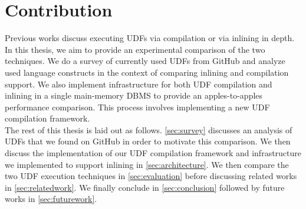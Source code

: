 \documentclass[12pt]{cmuthesis}
\newcommand{\sysname}{NoisePage\xspace}
\begin{document}

\section{Contribution}

Previous works discuss executing UDFs via compilation or via inlining in depth. In this thesis, we aim to provide an experimental comparison of the two techniques. We do a survey of currently used UDFs from GitHub and analyze used language constructs in the context of comparing inlining and compilation support. We also implement infrastructure for both UDF compilation and inlining in a single main-memory DBMS to provide an apples-to-apples performance comparison. This process involves implementing a new UDF compilation framework.\\


The rest of this thesis is laid out as follows. \cref{sec:survey} discusses an analysis of UDFs that we found on GitHub in order to motivate this comparison. We then discuss the implementation of our UDF compilation framework and infrastructure we implemented to support inlining in \cref{sec:architecture}. We then compare the two UDF execution techniques in \cref{sec:evaluation} before discussing related works in \cref{sec:relatedwork}. We finally conclude in \cref{sec:conclusion} followed by future works in \cref{sec:futurework}. 
\end{document}
